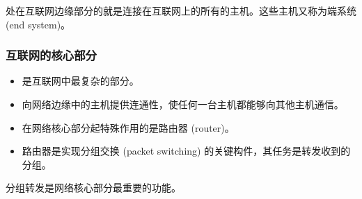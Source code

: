 \documentclass[11pt]{article}
\begin{document}
处在互联网边缘部分的就是连接在互联网上的所有的主机。这些主机又称为端系统 (end system)。
\subsubsection{互联网的核心部分}
\label{sec:org73dec6b}
\begin{itemize}
\item 是互联网中最复杂的部分。
\item 向网络边缘中的主机提供连通性，使任何一台主机都能够向其他主机通信。
\item 在网络核心部分起特殊作用的是路由器 (router)。
\item 路由器是实现分组交换 (packet switching) 的关键构件，其任务是转发收到的分组。
\end{itemize}

分组转发是网络核心部分最重要的功能。
\end{document}
